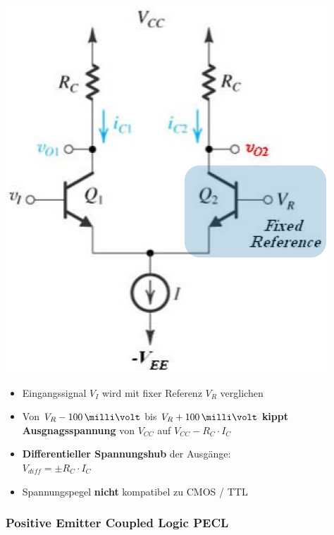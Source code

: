 \begin{minipage}[c]{0.25\columnwidth}
    \includegraphics[width=\columnwidth]{images/ECL.png}
\end{minipage}
\hfill
\begin{minipage}[c]{0.72\columnwidth}
   \begin{itemize}
    \item Eingangssignal $V_I$ wird mit fixer Referenz $V_R$ verglichen
    \item Von $V_R - 100 \, \milli \volt$ bis $V_R + 100 \, \milli \volt$ \textbf{kippt Ausgnagsspannung} von 
        $V_{CC}$ auf $V_{CC} - R_C \cdot I_C$
    \item \textbf{Differentieller Spannungshub} der Ausgänge: \\
        $V_{diff} = \pm R_C \cdot I_C$
    \item Spannungspegel \textbf{nicht} kompatibel zu CMOS / TTL
   \end{itemize}
\end{minipage}


\subsubsection{Positive Emitter Coupled Logic PECL}

